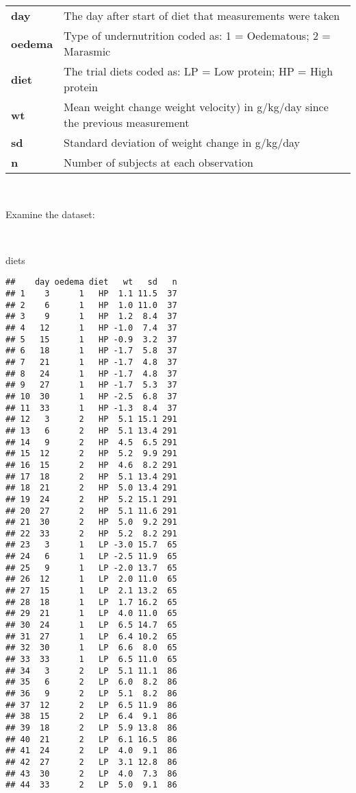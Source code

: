 \documentclass[
  12pt,
  a4paper]{book}
\newenvironment{Shaded}{\begin{snugshade}}{\end{snugshade}}
\newcommand{\NormalTok}[1]{#1}
\begin{document}
\begin{longtable}[]{@{}
  >{\raggedright\arraybackslash}p{}
  >{\raggedright\arraybackslash}p{}@{}}
\toprule
\endhead
\textbf{day} & The day after start of diet that measurements were taken \\
\textbf{oedema} & Type of undernutrition coded as: 1 = Oedematous; 2 = Marasmic \\
\textbf{diet} & The trial diets coded as: LP = Low protein; HP = High protein \\
\textbf{wt} & Mean weight change weight velocity) in g/kg/day since the previous measurement \\
\textbf{sd} & Standard deviation of weight change in g/kg/day \\
\textbf{n} & Number of subjects at each observation \\
\bottomrule
\end{longtable}

~

Examine the dataset:

~

\begin{Shaded}
\begin{Highlighting}[]
\NormalTok{diets}
\end{Highlighting}
\end{Shaded}

\begin{verbatim}
##    day oedema diet   wt   sd   n
## 1    3      1   HP  1.1 11.5  37
## 2    6      1   HP  1.0 11.0  37
## 3    9      1   HP  1.2  8.4  37
## 4   12      1   HP -1.0  7.4  37
## 5   15      1   HP -0.9  3.2  37
## 6   18      1   HP -1.7  5.8  37
## 7   21      1   HP -1.7  4.8  37
## 8   24      1   HP -1.7  4.8  37
## 9   27      1   HP -1.7  5.3  37
## 10  30      1   HP -2.5  6.8  37
## 11  33      1   HP -1.3  8.4  37
## 12   3      2   HP  5.1 15.1 291
## 13   6      2   HP  5.1 13.4 291
## 14   9      2   HP  4.5  6.5 291
## 15  12      2   HP  5.2  9.9 291
## 16  15      2   HP  4.6  8.2 291
## 17  18      2   HP  5.1 13.4 291
## 18  21      2   HP  5.0 13.4 291
## 19  24      2   HP  5.2 15.1 291
## 20  27      2   HP  5.1 11.6 291
## 21  30      2   HP  5.0  9.2 291
## 22  33      2   HP  5.2  8.2 291
## 23   3      1   LP -3.0 15.7  65
## 24   6      1   LP -2.5 11.9  65
## 25   9      1   LP -2.0 13.7  65
## 26  12      1   LP  2.0 11.0  65
## 27  15      1   LP  2.1 13.2  65
## 28  18      1   LP  1.7 16.2  65
## 29  21      1   LP  4.0 11.0  65
## 30  24      1   LP  6.5 14.7  65
## 31  27      1   LP  6.4 10.2  65
## 32  30      1   LP  6.6  8.0  65
## 33  33      1   LP  6.5 11.0  65
## 34   3      2   LP  5.1 11.1  86
## 35   6      2   LP  6.0  8.2  86
## 36   9      2   LP  5.1  8.2  86
## 37  12      2   LP  6.5 11.9  86
## 38  15      2   LP  6.4  9.1  86
## 39  18      2   LP  5.9 13.8  86
## 40  21      2   LP  6.1 16.5  86
## 41  24      2   LP  4.0  9.1  86
## 42  27      2   LP  3.1 12.8  86
## 43  30      2   LP  4.0  7.3  86
## 44  33      2   LP  5.0  9.1  86
\end{verbatim}
\end{document}
